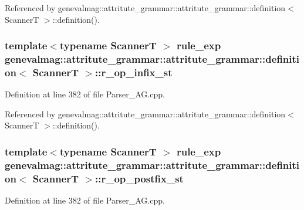 Referenced by genevalmag::attritute\_\-grammar::attritute\_\-grammar::definition$<$ ScannerT $>$::definition().\hypertarget{structgenevalmag_1_1attritute__grammar_1_1definition_4a304c9477cfd412adddaaa3e54552b7}{
\subsubsection[{r\_\-op\_\-infix\_\-st}]{\setlength{\rightskip}{0pt plus 5cm}template$<$typename ScannerT $>$ {\bf rule\_\-exp} genevalmag::attritute\_\-grammar::attritute\_\-grammar::definition$<$ ScannerT $>$::{\bf r\_\-op\_\-infix\_\-st}}}
\label{structgenevalmag_1_1attritute__grammar_1_1definition_4a304c9477cfd412adddaaa3e54552b7}




Definition at line 382 of file Parser\_\-AG.cpp.

Referenced by genevalmag::attritute\_\-grammar::attritute\_\-grammar::definition$<$ ScannerT $>$::definition().\hypertarget{structgenevalmag_1_1attritute__grammar_1_1definition_16910949a4653693875069e47c7e3e60}{
\subsubsection[{r\_\-op\_\-postfix\_\-st}]{\setlength{\rightskip}{0pt plus 5cm}template$<$typename ScannerT $>$ {\bf rule\_\-exp} genevalmag::attritute\_\-grammar::attritute\_\-grammar::definition$<$ ScannerT $>$::{\bf r\_\-op\_\-postfix\_\-st}}}
\label{structgenevalmag_1_1attritute__grammar_1_1definition_16910949a4653693875069e47c7e3e60}




Definition at line 382 of file Parser\_\-AG.cpp.


